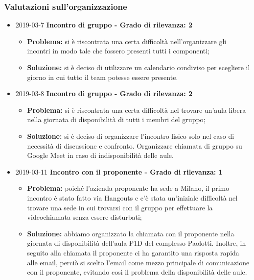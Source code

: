 \subsubsection{Valutazioni sull'organizzazione}
\begin{itemize}	
		
		\item 2019-03-7 \textbf{Incontro di gruppo - Grado di rilevanza: 2} \\
		\begin{itemize}
			\item \textbf{Problema:} si è riscontrata una certa difficoltà 				nell'organizzare gli incontri in modo
		tale che fossero presenti tutti i componenti;
			\item \textbf{Soluzione:} si è deciso di utilizzare un calendario condiviso per scegliere il giorno
		in cui tutto il team potesse essere presente. 
		\end{itemize}
		
		\item 2019-03-8 \textbf{Incontro di gruppo - Grado di rilevanza: 2} \\
		\begin{itemize}
			\item \textbf{Problema:} si è riscontrata una certa difficoltà nel trovare un'aula libera nella giornata di disponibilità di tutti i membri del gruppo;
			\item \textbf{Soluzione:} si è deciso di organizzare l'incontro fisico solo nel caso di necessità di discussione e confronto. Organizzare chiamata di gruppo su Google Meet in caso di indisponibilità delle aule. 
		\end{itemize}
						
						
		\item 2019-03-11 \textbf{Incontro con il proponente - Grado di rilevanza: 1} \\
		\begin{itemize}
			\item \textbf{Problema:} poiché l'azienda proponente ha sede a Milano, il primo incontro è stato fatto
		via Hangouts e c'è stata un'iniziale difficoltà nel trovare una sede in cui 
		trovarsi con il gruppo per effettuare la videochiamata senza essere disturbati;
			\item \textbf{Soluzione:} abbiamo organizzato la chiamata con il proponente nella giornata di disponibilità dell'aula P1D del complesso Paolotti. Inoltre, in seguito alla chiamata il proponente ci ha garantito una risposta rapida alle email, perciò si scelto l'email come mezzo principale di comunicazione con il proponente, evitando così il problema della disponibilità delle aule.
		\end{itemize}
		

\end{itemize}
